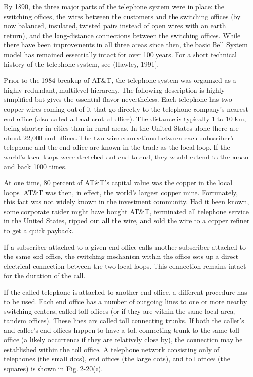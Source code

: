 By 1890, the three major parts of the telephone system were in place:
the switching offices, the wires between the customers and the switching
offices (by now balanced, insulated, twisted pairs instead of open wires
with an earth return), and the long-distance connections between the
switching offices. While there have been improvements in all three areas
since then, the basic Bell System model has remained essentially intact
for over 100 years. For a short technical history of the telephone
system, see (Hawley, 1991).

Prior to the 1984 breakup of AT\&T, the telephone system was organized
as a highly-redundant, multilevel hierarchy. The following description
is highly simplified but gives the essential flavor nevertheless. Each
telephone has two copper wires coming out of it that go directly to the
telephone company's nearest {end office} (also called a {local central
office}). The distance is typically 1 to 10 km, being shorter in cities
than in rural areas. In the United States alone there are about 22,000
end offices. The two-wire connections between each subscriber's
telephone and the end office are known in the trade as the {local loop}.
If the world's local loops were stretched out end to end, they would
extend to the moon and back 1000 times.

At one time, 80 percent of AT\&T's capital value was the copper in the
local loops. AT\&T was then, in effect, the world's largest copper mine.
Fortunately, this fact was not widely known in the investment community.
Had it been known, some corporate raider might have bought AT\&T,
terminated all telephone service in the United States, ripped out all
the wire, and sold the wire to a copper refiner to get a quick payback.

If a subscriber attached to a given end office calls another subscriber
attached to the same end office, the switching mechanism within the
office sets up a direct electrical connection between the two local
loops. This connection remains intact for the duration of the call.

If the called telephone is attached to another end office, a different
procedure has to be used. Each end office has a number of outgoing lines
to one or more nearby switching centers, called {toll offices} (or if
they are within the same local area, {tandem offices}). These lines are
called {toll connecting trunks}. If both the caller's and callee's end
offices happen to have a toll connecting trunk to the same toll office
(a likely occurrence if they are relatively close by), the connection
may be established within the toll office. A telephone network
consisting only of telephones (the small dots), end offices (the large
dots), and toll offices (the squares) is shown in
\protect\hyperlink{0130661023_ch02lev1sec5.htmlux5cux23ch02fig20}{Fig.
2-20(c)}.


